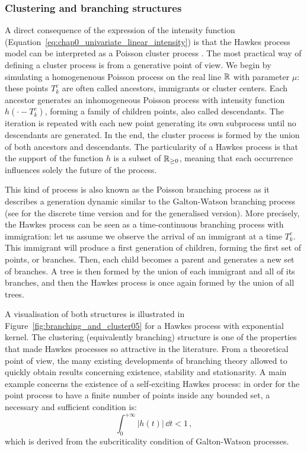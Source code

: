     \subsubsection{Clustering and branching structures}
    A direct consequence of the expression of the intensity function (Equation~\eqref{eq:chap0_univariate_linear_intensity}) is that the Hawkes process model can be interpreted as a Poisson cluster process \parencite{Hawkes1974}.
    The most practical way of defining a cluster process \parencite{Bartlett1963} is from a generative point of view.
    We begin by simulating a homogenenous Poisson process on the real line ${\mathbb R}$ with parameter $\mu$: these points $T_k^c$ are often called ancestors, immigrants or cluster centers.
    Each ancestor generates an inhomogeneous Poisson process with intensity function $h(\cdot - T_k^c)$, forming a family of children points, also called descendants.
    The iteration is repeated with each new point generating its own subprocess until no descendants are generated.
    In the end, the cluster process is formed by the union of both ancestors and descendants.
    The particularity of a Hawkes process is that the support of the function $h$ is a subset of ${\mathbb R}_{\geq0}$, meaning that each occurrence influences solely the future of the process.

    This kind of process is also known as the Poisson branching process \parencite{Lewis1964} as it describes a generation dynamic similar to the Galton-Watson branching process (see \textcite{Watson1875} for the discrete time version and \textcite[Chapter III]{Harris02} for the generalised version).
    More precisely, the Hawkes process can be seen as a time-continuous branching process with immigration:
    let us assume we observe the arrival of an immigrant at a time $T_k^c$.
    This immigrant will produce a first generation of children, forming the first set of points, or branches.
    Then, each child becomes a parent and generates a new set of branches.
    A tree is then formed by the union of each immigrant and all of its branches, and then the Hawkes process is once again formed by the union of all trees.

    A visualisation of both structures is illustrated in Figure~\ref{fig:branching_and_cluster05} for a Hawkes process with exponential kernel. 
    The clustering (equivalently branching) structure is one of the properties that made Hawkes processes so attractive in the literature.
    From a theoretical point of view, the many existing developments of branching theory allowed to quickly obtain results concerning existence, stability and stationarity.
    A main example concerns the existence of a self-exciting Hawkes process: in order for the point process to have a finite number of points inside any bounded set, a necessary and sufficient condition \parencite[Lemma 1]{Hawkes1974} is:
    \[\int_{0}^{+\infty}{\lvert h(t)\rvert \,\dd t} < 1\,,\]
    which is derived from the subcriticality condition of Galton-Watson processes.

